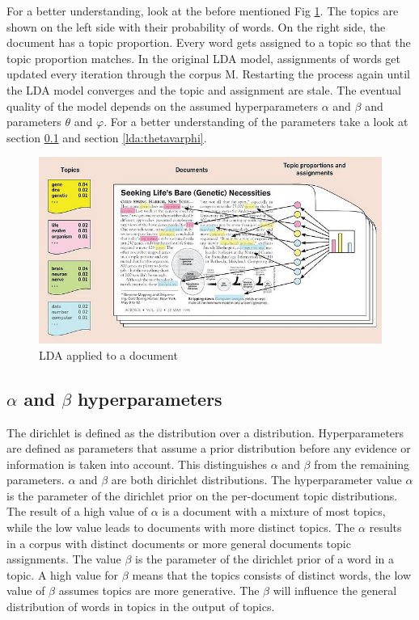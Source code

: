 For a better understanding, look at the before mentioned Fig \ref{fig:LDA_example}. The topics are shown on the left side with their probability of words. On the right side, the document has a topic proportion. Every word gets assigned to a topic so that the topic proportion matches.  
In the original LDA model, assignments of words get updated every iteration through the corpus M. Restarting the process again until the LDA model converges and the topic and assignment are stale. The eventual quality of the model depends on the assumed hyperparameters $\alpha$ and $\beta$ and parameters $\theta$ and $\varphi$. For a better understanding of the parameters take a look at section \ref{lda:alphabeta} and section \ref{lda:thetavarphi}.

\begin{figure}
    \centering
    \includegraphics[scale=0.6]{methodology/700px-Illustrating_LDA.jpg}
    \caption{LDA applied to a document}
    \label{fig:LDA_example}
\end{figure}

\subsection{$\alpha$ and $\beta$ hyperparameters}  \label{lda:alphabeta}
The dirichlet is defined as the distribution over a distribution. Hyperparameters are defined as parameters that assume a prior distribution before any evidence or information is taken into account. This distinguishes $\alpha$ and $\beta$ from the remaining parameters. $\alpha$ and $\beta$ are both dirichlet distributions. The hyperparameter value $\alpha$ is the parameter of the dirichlet prior on the per-document topic distributions. The result of a high value of $\alpha$ is a document with a mixture of most topics, while the low value leads to documents with more distinct topics. The $\alpha$ results in a corpus with distinct documents or more general documents topic assignments. The value $\beta$ is the parameter of the dirichlet prior of a word in a topic. A high value for $\beta$ means that the topics consists of distinct words, the low value of $\beta$ assumes topics are more generative. The $\beta$ will influence the general distribution of words in topics in the output of topics.

